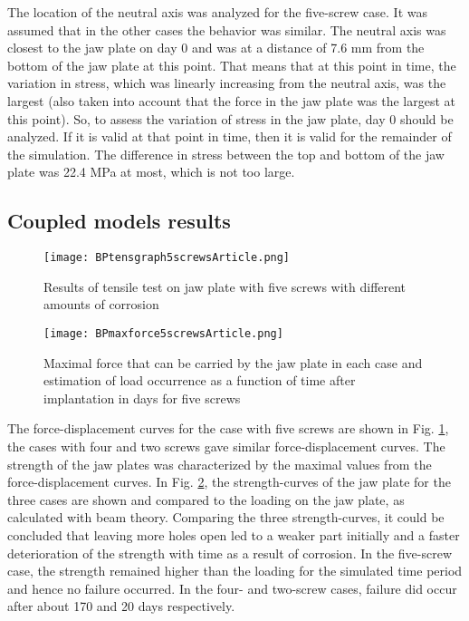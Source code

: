 The location of the neutral axis was analyzed for the five-screw case. It was assumed that in the other cases the behavior was similar. The neutral axis was closest to the jaw plate on day 0 and was at a distance of 7.6 mm from the bottom of the jaw plate at this point. That means that at this point in time, the variation in stress, which was linearly increasing from the neutral axis, was the largest (also taken into account that the force in the jaw plate was the largest at this point). So, to assess the variation of stress in the jaw plate, day 0 should be analyzed. If it is valid at that point in time, then it is valid for the remainder of the simulation. The difference in stress between the top and bottom of the jaw plate was 22.4 MPa at most, which is not too large.



\subsection{Coupled models results}

\begin{figure}[h]
    \centering
    \texttt{[image: BPtensgraph5screwsArticle.png]}
    \caption{Results of tensile test on jaw plate with five screws with different amounts of corrosion}
    \label{fig:BPtensgraph5screws}
\end{figure}

\begin{figure}[h]
    \centering
    \texttt{[image: BPmaxforce5screwsArticle.png]}
    \caption{Maximal force that can be carried by the jaw plate in each case and estimation of load occurrence as a function of time after implantation in days for five screws}
    \label{fig:BPmaxforce5screws}
\end{figure}

The force-displacement curves for the case with five screws are shown in Fig. \ref{fig:BPtensgraph5screws}, the cases with four and two screws gave similar force-displacement curves. The strength of the jaw plates was characterized by the maximal values from the force-displacement curves. In Fig. \ref{fig:BPmaxforce5screws}, the strength-curves of the jaw plate for the three cases are shown and compared to the loading on the jaw plate, as calculated with beam theory. Comparing the three strength-curves, it could be concluded that leaving more holes open led to a weaker part initially and a faster deterioration of the strength with time as a result of corrosion. In the five-screw case, the strength remained higher than the loading for the simulated time period and hence no failure occurred. In the four- and two-screw cases, failure did occur after about 170 and 20 days respectively.


